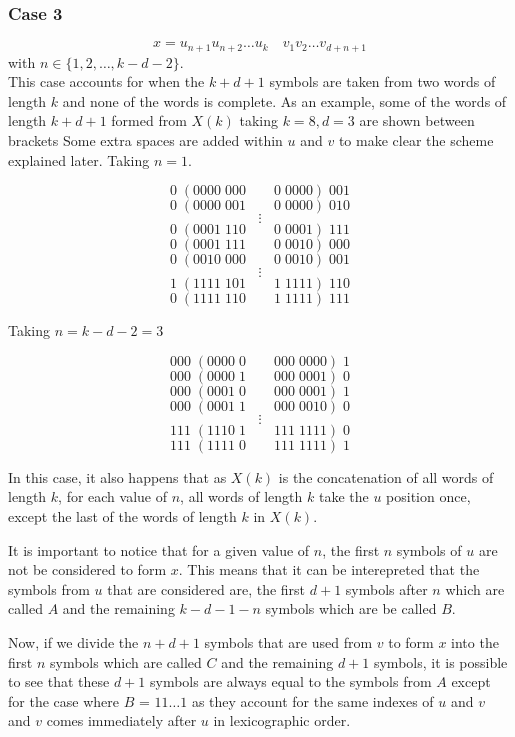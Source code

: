 \documentclass[11pt,a4paper]{tesis}
\theoremstyle{definition}
\begin{document}
\subsubsection{Case 3}
$$x = u_{n+1} u_{n+2} \dots u_k \quad  v_1 v_2 \dots v_{d+n+1} $$
with $n \in \{1,2,\dots ,k - d - 2\}$.
\\

This case accounts for when the $k + d + 1$ symbols are taken from two words of length $k$ and none of the words is complete.
As an example, some of the words of length $k + d + 1$ formed from $X(k)$ taking $k = 8, d = 3$ are shown between brackets
Some extra spaces are added within $u$ and $v$ to make clear the scheme explained later.
Taking $n = 1$.


$$0\; (0000\; 000 \qquad 0 \;0000 ) \;001$$
$$0\; (0000 \;001 \qquad 0 \;0000 ) \;010$$
$$\vdots$$
$$0\; (0001 \;110 \qquad 0 \;0001 ) \;111$$
$$0\; (0001 \;111 \qquad 0 \;0010 ) \;000$$
$$0\; (0010 \;000 \qquad 0 \;0010 ) \;001$$
$$\vdots$$
$$1\; (1111 \;101 \qquad 1 \;1111 ) \;110$$
$$0\; (1111 \;110 \qquad 1 \;1111 ) \;111$$

Taking $n = k - d - 2 = 3$

$$000\; (0000\; 0 \qquad 000 \;0000 ) \;1$$
$$000\; (0000\; 1 \qquad 000 \;0001 ) \;0$$
$$000\; (0001\; 0 \qquad 000 \;0001 ) \;1$$
$$000\; (0001\; 1 \qquad 000 \;0010 ) \;0$$
$$\vdots$$
$$111\; (1110\; 1 \qquad 111 \;1111 ) \;0$$
$$111\; (1111\; 0 \qquad 111 \;1111 ) \;1$$

In this case, it also happens that as $X(k)$ is the concatenation of all words of length $k$, for each value of $n$, all words of length $k$ take the $u$ position once, except the last of the words of length $k$ in $X(k)$.

It is important to notice that for a given value of $n$, the first $n$ symbols of $u$ are not be considered to form $x$. This means that it can be interepreted that the symbols from  $u$ that are considered are, the first $d + 1$ symbols after $n$ which are called $A$ and the remaining $k - d - 1 - n$ symbols which are be called $B$.

Now, if we divide the $n + d + 1$ symbols that are used from $v$ to form $x$ into the first $n$ symbols which are called $C$ and the remaining $d + 1$ symbols, it is possible to see that these $d + 1$ symbols are always equal to the symbols from $A$ except for the case where $B$ = $11\dots1$ as they account for the same indexes of $u$ and $v$ and $v$ comes immediately after $u$ in lexicographic order. 
\end{document}
